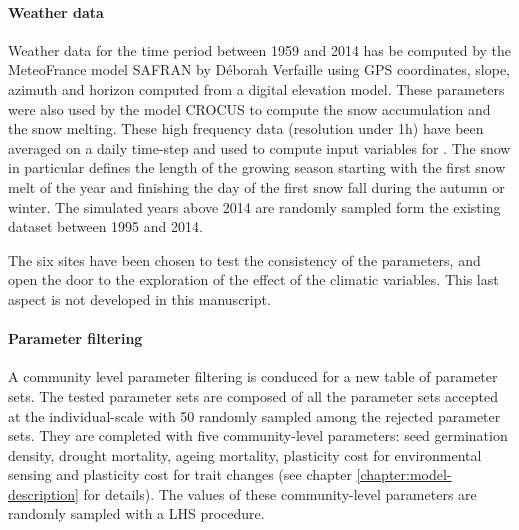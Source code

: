 
\paragraph{Weather data}
Weather data for the time period between 1959 and 2014 has be computed by the MeteoFrance model SAFRAN by Déborah Verfaille using GPS coordinates, slope, azimuth and horizon computed from a digital elevation model. These parameters were also used by the model CROCUS to compute the snow accumulation and the snow melting. These high frequency data (resolution under 1h) have been averaged on a daily time-step and used to compute input variables for \model. The snow in particular defines the length of the growing season starting with the first snow melt of the year and finishing the day of the first snow fall during the autumn or winter. The simulated years above 2014 are randomly sampled form the existing dataset between 1995 and 2014.

The six sites have been chosen to test the consistency of the parameters, and open the door to the exploration of the effect of the climatic variables. This last aspect is not developed in this manuscript.

\paragraph{Parameter filtering}
A community level parameter filtering is conduced for a new table of parameter sets. The tested parameter sets are composed of all the parameter sets accepted at the individual-scale with 50 randomly sampled among the rejected parameter sets. They are completed with five community-level parameters: seed germination density, drought mortality, ageing mortality, plasticity cost for environmental sensing and plasticity cost for trait changes (see chapter \ref{chapter:model-description} for details). The values of these community-level parameters are randomly sampled with a LHS procedure.

